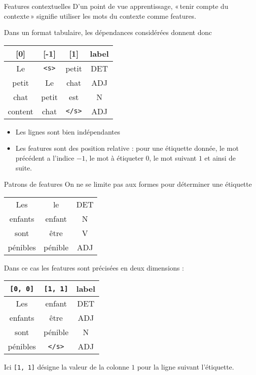 \documentclass[hyperref={unicode}, xcolor={svgnames}, french]{beamer}
\begin{document}
\begin{frame}[fragile=singleslide]{Features contextuelles}
	D'un point de vue apprentissage, « tenir compte du contexte » signifie utiliser les mots du contexte comme \alert{features}.

	Dans un format tabulaire, les dépendances considérées donnent donc
	\begin{table}
		\begin{tabu} to .9\textwidth {cccc}
			[0]	& [-1]	& [1]	& label\\
			\midrule
			Le	& \texttt{<s>}	& petit	& DET\\
			petit	& Le	& chat	& ADJ\\
			chat	& petit	& est	& N\\
			content	& chat	& \texttt{</s>}	& ADJ
		\end{tabu}
	\end{table}

	\begin{itemize}
		\item Les lignes sont bien indépendantes
		\item Les features sont des position relative : pour une étiquette donnée, le mot précédent a l'indice $-1$, le mot à étiqueter $0$, le mot suivant $1$ et ainsi de suite.
	\end{itemize}
\end{frame}

\begin{frame}[fragile=singleslide]{Patrons de features}
	On ne se limite pas aux formes pour déterminer une étiquette
	\vspace{-\smallskipamount}
	\begin{table}
		\begin{tabu} to .9\textwidth {ccc}
			Les	& le	& DET\\
			enfants	& enfant	& N\\
			sont	& être	& V\\
			pénibles & pénible	& ADJ
		\end{tabu}
	\end{table}
	\vspace{-\smallskipamount}
	Dans ce cas les features sont précisées en deux dimensions :
	\begin{table}
		\begin{tabu} to .9\textwidth {ccc}
			\texttt{[0, 0]}	& \texttt{[1, 1]}	& label\\
			\midrule
			Les	& enfant 	& DET\\
			enfants	& être 	& ADJ\\
			sont	& pénible 	& N\\
			pénibles	& \texttt{</s>}	& ADJ
		\end{tabu}
	\end{table}
	\vspace{-1.5\smallskipamount}
	Ici \texttt{[1, 1]} désigne la valeur de la colonne $1$ pour la ligne suivant l'étiquette.
\end{frame}
\end{document}
